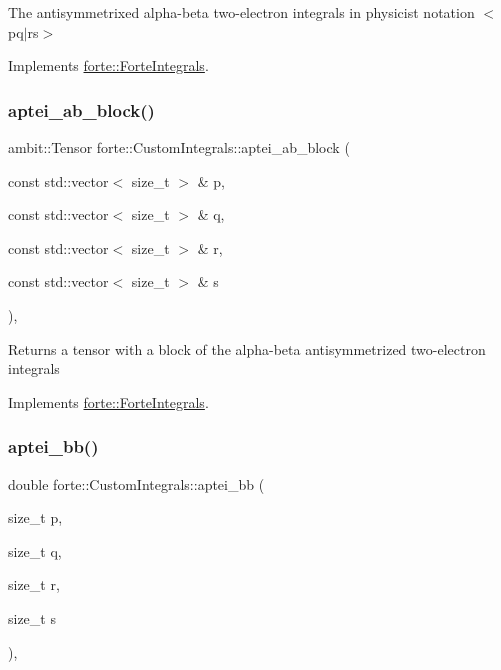 The antisymmetrixed alpha-\/beta two-\/electron integrals in physicist notation $<$pq$\vert$rs$>$ 



Implements \mbox{\hyperlink{classforte_1_1_forte_integrals_a45efc2329cdfc7e4690cbe85688b947e}{forte\+::\+Forte\+Integrals}}.

\mbox{\label{classforte_1_1_custom_integrals_af65b7d58e92e6ec9a13c93238724a831}} 
\subsubsection{\texorpdfstring{aptei\+\_\+ab\+\_\+block()}{aptei\_ab\_block()}}
{\footnotesize\ttfamily ambit\+::\+Tensor forte\+::\+Custom\+Integrals\+::aptei\+\_\+ab\+\_\+block (\begin{DoxyParamCaption}\item[{const std\+::vector$<$ size\+\_\+t $>$ \&}]{p,  }\item[{const std\+::vector$<$ size\+\_\+t $>$ \&}]{q,  }\item[{const std\+::vector$<$ size\+\_\+t $>$ \&}]{r,  }\item[{const std\+::vector$<$ size\+\_\+t $>$ \&}]{s }\end{DoxyParamCaption})\hspace{0.3cm}{\ttfamily [override]}, {\ttfamily [virtual]}}

\begin{DoxyReturn}{Returns}
a tensor with a block of the alpha-\/beta antisymmetrized two-\/electron integrals 
\end{DoxyReturn}


Implements \mbox{\hyperlink{classforte_1_1_forte_integrals_acd40e350dc861baf8adf6a3b47c74023}{forte\+::\+Forte\+Integrals}}.

\mbox{\label{classforte_1_1_custom_integrals_a2f10a8117087972091b1a7b7188bf797}} 
\subsubsection{\texorpdfstring{aptei\+\_\+bb()}{aptei\_bb()}}
{\footnotesize\ttfamily double forte\+::\+Custom\+Integrals\+::aptei\+\_\+bb (\begin{DoxyParamCaption}\item[{size\+\_\+t}]{p,  }\item[{size\+\_\+t}]{q,  }\item[{size\+\_\+t}]{r,  }\item[{size\+\_\+t}]{s }\end{DoxyParamCaption})\hspace{0.3cm}{\ttfamily [override]}, {\ttfamily [virtual]}}



